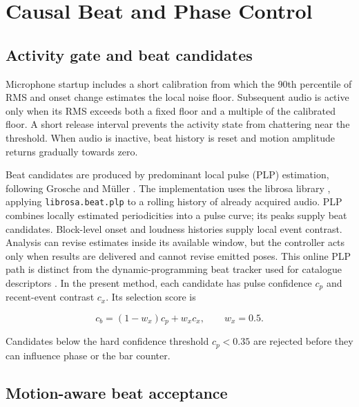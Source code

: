 \section{Causal Beat and Phase Control}
\label{sec:ch5_beat_phase_control}

\subsection{Activity gate and beat candidates}
\label{subsec:ch5_beat_candidates}

Microphone startup includes a short calibration from which the 90th percentile
of RMS and onset change estimates the local noise floor. Subsequent audio is
active only when its RMS exceeds both a fixed floor and a multiple of the
calibrated floor. A short release interval prevents the activity state from
chattering near the threshold. When audio is inactive, beat history is reset
and motion amplitude returns gradually towards zero.

Beat candidates are produced by predominant local pulse (PLP) estimation,
following Grosche and M\"uller \cite{grosche2010extracting}.
The implementation uses the librosa library \cite{mcfee2015librosa}, applying
\texttt{librosa.beat.plp} to a rolling history of already acquired audio.
PLP combines locally estimated periodicities
into a pulse curve; its peaks supply beat candidates. Block-level onset and
loudness histories supply local event contrast. Analysis can revise estimates
inside its available window, but the controller acts only when results are
delivered and cannot revise emitted poses. This online PLP path is distinct
from the dynamic-programming beat tracker used for catalogue descriptors
\cite{ellis2007beat}. In the present method,
each candidate has pulse confidence $c_p$ and recent-event contrast $c_x$. Its
selection score is

\begin{equation}
    c_b=(1-w_x)c_p+w_xc_x,
    \qquad w_x=0.5.
    \label{eq:ch5_beat_selection_score}
\end{equation}

Candidates below the hard confidence threshold $c_p<0.35$ are rejected before
they can influence phase or the bar counter.

\subsection{Motion-aware beat acceptance}
\label{subsec:ch5_beat_acceptance}

